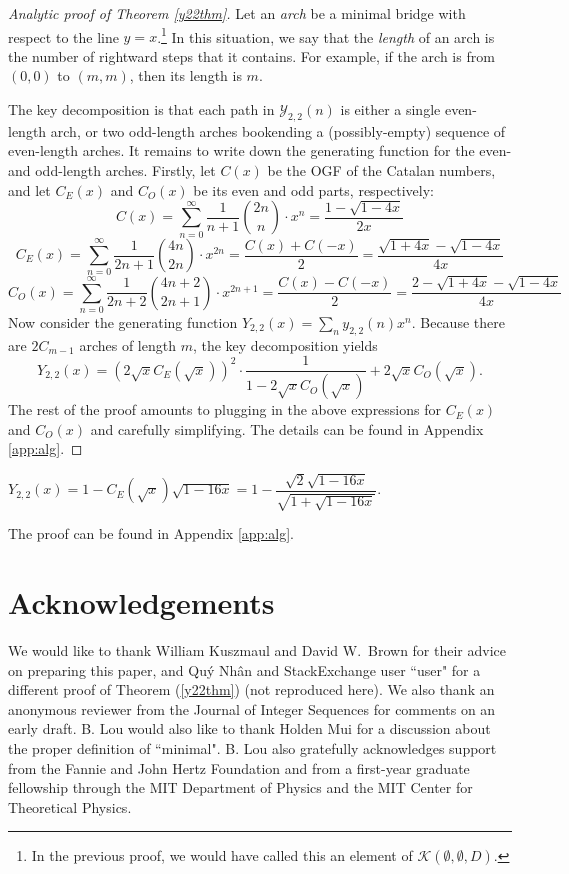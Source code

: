 \documentclass[10pt]{article}
\newcommand{\eqn}[1]{\begin{equation*} #1 \end{equation*}}
\newcommand{\neqn}[1]{\begin{equation} #1 \end{equation}}
\begin{document}
\begin{proof}[Analytic proof of Theorem \ref{y22thm}]
Let an \emph{arch} be a minimal bridge with respect to the line $y=x$.\footnote{In the previous proof, we would have called this an element of $\mathcal{K}(\emptyset,\emptyset,D)$.} In this situation, we say that the \emph{length} of an arch is the number of rightward steps that it contains. For example, if the arch is from $(0,0)$ to $(m,m)$, then its length is $m$.

The key decomposition is that each path in $\mathcal{Y}_{2,2}(n)$ is either a single even-length arch, or two odd-length arches bookending a (possibly-empty) sequence of even-length arches. It remains to write down the generating function for the even- and odd-length arches. Firstly, let $C(x)$ be the OGF of the Catalan numbers, and let $C_E(x)$ and $C_O(x)$ be its even and odd parts, respectively:
\eqn{C(x) = \sum_{n=0}^\infty \frac{1}{n+1} \binom{2n}{n} \cdot x^n = \frac{1-\sqrt{1-4x}}{2x}}
\eqn{C_E(x) = \sum_{n=0}^\infty \frac{1}{2n+1} \binom{4n}{2n} \cdot x^{2n} = \frac{C(x) + C(-x)}{2} = \frac{\sqrt{1+4x} - \sqrt{1-4x}}{4x}}
\eqn{C_O(x) = \sum_{n=0}^\infty \frac{1}{2n+2} \binom{4n+2}{2n+1} \cdot x^{2n+1} = \frac{C(x) - C(-x)}{2} = \frac{2 - \sqrt{1+4x} - \sqrt{1-4x}}{4x}}
Now consider the generating function $Y_{2,2}(x)=\sum_n y_{2,2}(n) x^{n}$.  Because there are $2C_{m-1}$ arches of length $m$, the key decomposition yields
\neqn{Y_{2,2}(x) = \left( 2\sqrt{x} C_E(\sqrt{x}) \right)^2 \cdot \frac{1}{1 - 2\sqrt{x} C_O(\sqrt{x})} + 2\sqrt{x} C_O(\sqrt{x}). \label{Y22x}}
The rest of the proof amounts to plugging in the above expressions for $C_E(x)$ and $C_O(x)$ and carefully simplifying. The details can be found in Appendix \ref{app:alg}.
\end{proof}
\begin{corollary} \label{y22cor}
$Y_{2,2}(x) = 1 - C_E(\sqrt{x}) \sqrt{1-16x}= 1 - \dfrac{\sqrt{2}\sqrt{1-16x}}{\sqrt{1+\sqrt{1-16x}}}$.
\end{corollary}
The proof can be found in Appendix \ref{app:alg}.

\section{Acknowledgements}

We would like to thank William Kuszmaul and David W.\ Brown for their advice on preparing this paper, and Qu\'{y} Nh\^{a}n and StackExchange user ``user" for a different proof of Theorem (\ref{y22thm}) (not reproduced here). We also thank an anonymous reviewer from the Journal of Integer Sequences for comments on an early draft. B. Lou would also like to thank Holden Mui for a discussion about the proper definition of ``minimal". B. Lou also gratefully acknowledges support from the  Fannie and John Hertz Foundation and from a first-year graduate fellowship through the MIT Department of Physics and the MIT Center for Theoretical Physics.
\end{document}
